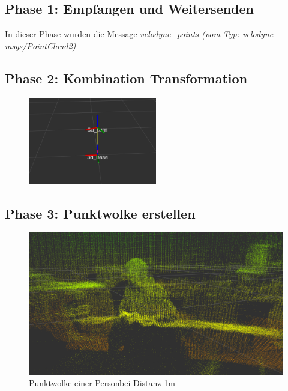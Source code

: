\subsection{Phase 1: Empfangen und Weitersenden}

In dieser Phase wurden die Message \textit{velodyne\_points (vom Typ: velodyne\_ msgs/PointCloud2)}

 

\subsection{Phase 2: Kombination Transformation}




\begin{figure}[H]
	\centering
	\includegraphics[width=0.5\textwidth]{resources/tf_rotation.PNG}
	\label{fig:software_ros}
\end{figure} 



\subsection{Phase 3: Punktwolke erstellen}

\begin{figure}[H]
\centering
\includegraphics[width=1.0\textwidth]{resources/pointcloud_test.png}
\caption[Punktwolke einer Personbei Distanz 1m]{Punktwolke einer Personbei Distanz 1m}
\label{fig:pointcloud_test}
\end{figure}

